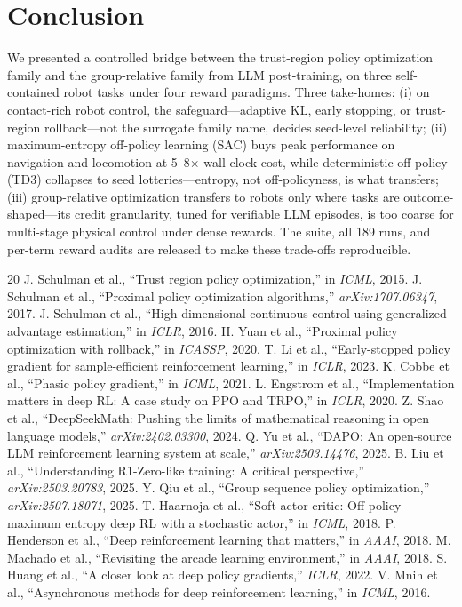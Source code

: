 \documentclass[journal,twoside]{IEEEtran}
\begin{document}
\section{Conclusion}
We presented a controlled bridge between the trust-region policy
optimization family and the group-relative family from LLM post-training,
on three self-contained robot tasks under four reward paradigms. Three
take-homes: (i) on contact-rich robot control, the safeguard---adaptive
KL, early stopping, or trust-region rollback---not the surrogate family
name, decides seed-level reliability; (ii) maximum-entropy off-policy learning (SAC) buys peak performance on
navigation and locomotion at 5--8$\times$ wall-clock cost, while
deterministic off-policy (TD3) collapses to seed lotteries---entropy, not
off-policyness, is what transfers; (iii) group-relative optimization transfers to robots
only where tasks are outcome-shaped---its credit granularity, tuned for
verifiable LLM episodes, is too coarse for multi-stage physical control
under dense rewards. The suite, all 189 runs, and per-term reward audits
are released to make these trade-offs reproducible.


\begin{thebibliography}{20}
 J. Schulman et al., ``Trust region policy
optimization,'' in \emph{ICML}, 2015.
 J. Schulman et al., ``Proximal policy
optimization algorithms,'' \emph{arXiv:1707.06347}, 2017.
 J. Schulman et al., ``High-dimensional continuous
control using generalized advantage estimation,'' in \emph{ICLR}, 2016.
 H. Yuan et al., ``Proximal policy optimization
with rollback,'' in \emph{ICASSP}, 2020.
 T. Li et al., ``Early-stopped policy gradient for
sample-efficient reinforcement learning,'' in \emph{ICLR}, 2023.
 K. Cobbe et al., ``Phasic policy gradient,''
in \emph{ICML}, 2021.
 L. Engstrom et al., ``Implementation
matters in deep RL: A case study on PPO and TRPO,''
in \emph{ICLR}, 2020.
 Z. Shao et al., ``DeepSeekMath: Pushing the limits
of mathematical reasoning in open language models,''
\emph{arXiv:2402.03300}, 2024.
 Q. Yu et al., ``DAPO: An open-source LLM reinforcement
learning system at scale,'' \emph{arXiv:2503.14476}, 2025.
 B. Liu et al., ``Understanding R1-Zero-like
training: A critical perspective,'' \emph{arXiv:2503.20783}, 2025.
 Y. Qiu et al., ``Group sequence policy
optimization,'' \emph{arXiv:2507.18071}, 2025.
 T. Haarnoja et al., ``Soft actor-critic:
Off-policy maximum entropy deep RL with a stochastic actor,''
in \emph{ICML}, 2018.
 P. Henderson et al., ``Deep reinforcement
learning that matters,'' in \emph{AAAI}, 2018.
 M. Machado et al., ``Revisiting the arcade
learning environment,'' in \emph{AAAI}, 2018.
 S. Huang et al., ``A closer look at deep
policy gradients,'' \emph{ICLR}, 2022.
 V. Mnih et al., ``Asynchronous methods for deep
reinforcement learning,'' in \emph{ICML}, 2016.
\end{thebibliography}
\end{document}
